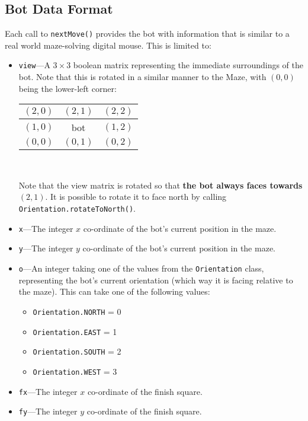 \documentclass[11pt]{article}
\begin{document}
\subsection{Bot Data Format}
\label{section:dataformat}
Each call to \texttt{nextMove()} provides the bot with information that is similar to a real world maze-solving digital mouse.  This is limited to:
\begin{itemize}
\item \texttt{view}---A $3 \times 3$ boolean matrix representing the immediate surroundings of the bot.  Note that this is rotated in a similar manner to the Maze, with $(0,0)$ being the lower-left corner:\\
        \begin{center}
        \begin{tabular}{|c|c|c|}
            \hline
            $(2,0)$ & $(2,1)$ & $(2,2)$ \\ \hline
            $(1,0)$ & bot     & $(1,2)$ \\ \hline
            $(0,0)$ & $(0,1)$ & $(0,2)$ \\ \hline
        \end{tabular}\\
        \end{center}
        \vspace{12pt}
        Note that the view matrix is rotated so that \textbf{the bot always faces towards $(2,1)$}.  It is possible to rotate it to face north by calling \texttt{Orientation.rotateToNorth()}.

\item \texttt{x}---The integer $x$ co-ordinate of the bot's current position in the maze.
\item \texttt{y}---The integer $y$ co-ordinate of the bot's current position in the maze.

\item \texttt{o}---An integer taking one of the values from the \texttt{Orientation} class, representing the bot's current orientation (which way it is facing relative to the maze).  This can take one of the following values:
    \begin{itemize}
    \item \texttt{Orientation.NORTH} = 0
    \item \texttt{Orientation.EAST} = 1 
    \item \texttt{Orientation.SOUTH} = 2
    \item \texttt{Orientation.WEST} = 3
    \end{itemize}

\item \texttt{fx}---The integer $x$ co-ordinate of the finish square.
\item \texttt{fy}---The integer $y$ co-ordinate of the finish square.
\end{itemize}
\end{document}
